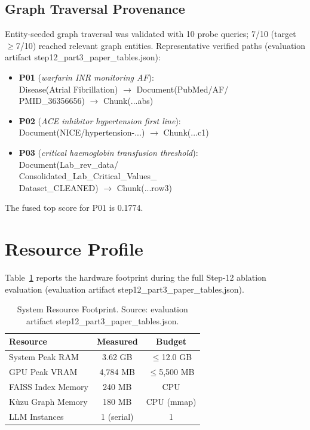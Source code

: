 \documentclass[conference]{IEEEtran}
\begin{document}
\subsection{Graph Traversal Provenance}

Entity-seeded graph traversal was validated with 10 probe queries; 7/10
(target~$\geq$7/10) reached relevant graph entities. Representative verified
paths (evaluation artifact step12\_part3\_paper\_tables.json):

\begin{itemize}
\item \textbf{P01} (\emph{warfarin INR monitoring AF}):\\
{\footnotesize Disease(Atrial Fibrillation) $\rightarrow$
Document(PubMed/AF/\\ PMID\_36356656) $\rightarrow$ Chunk(...abs)}
\item \textbf{P02} (\emph{ACE inhibitor hypertension first line}):\\
{\footnotesize Document(NICE/hypertension-...) $\rightarrow$ Chunk(...c1)}
\item \textbf{P03} (\emph{critical haemoglobin transfusion threshold}):\\
{\footnotesize Document(Lab\_rev\_data/\\
Consolidated\_Lab\_Critical\_Values\_\\
Dataset\_CLEANED) $\rightarrow$ Chunk(...row3)}
\end{itemize}

The fused top score for P01 is 0.1774.

\section{Resource Profile}

Table~\ref{tab:resources} reports the hardware footprint during the full
Step-12 ablation evaluation (evaluation artifact
step12\_part3\_paper\_tables.json).

\begin{table}[!t]
\caption{System Resource Footprint.
  Source: evaluation artifact step12\_part3\_paper\_tables.json.}
\label{tab:resources}
\centering
\renewcommand{\arraystretch}{1.2}
\begin{tabular}{@{}lcc@{}}
\toprule
\textbf{Resource} & \textbf{Measured} & \textbf{Budget}\\
\midrule
System Peak RAM    & 3.62 GB     & $\leq$12.0 GB \\
GPU Peak VRAM      & 4{,}784 MB  & $\leq$5{,}500 MB \\
FAISS Index Memory & 240 MB      & CPU \\
K\`{u}zu Graph Memory  & 180 MB  & CPU (mmap) \\
LLM Instances      & 1 (serial)  & 1 \\
\bottomrule
\end{tabular}
\end{table}
\end{document}
